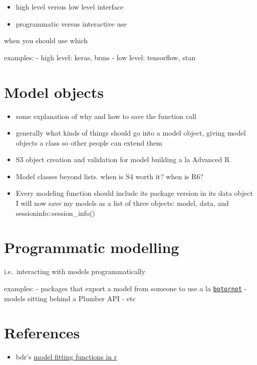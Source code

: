\documentclass[]{book}
\providecommand{\tightlist}{%
  \setlength{\itemsep}{0pt}\setlength{\parskip}{0pt}}
\theoremstyle{definition}
\theoremstyle{definition}
\theoremstyle{definition}
\theoremstyle{remark}
\begin{document}
\begin{itemize}
\tightlist
\item
  high level versus low level interface
\item
  programmatic versus interactive use
\end{itemize}

when you should use which

examples: - high level: keras, brms - low level: tensorflow, stan

\chapter{Model objects}\label{model-objects}

\begin{itemize}
\item
  some explanation of why and how to save the function call
\item
  generally what kinds of things should go into a model object, giving
  model objects a class so other people can extend them
\item
  S3 object creation and validation for model building a la Advanced R
\item
  Model classes beyond lists. when is S4 worth it? when is R6?
\item
  Every modeling function should include its package version in its data
  object I will now save my models as a list of three objects: model,
  data, and sessioninfo::session\_info()
\end{itemize}

\chapter{Programmatic modelling}\label{programmatic-modelling}

i.e.~interacting with models programmatically

examples: - packages that export a model from someone to use a la
\href{https://github.com/mkearney/tweetbotornot}{\texttt{botornot}} -
models sitting behind a Plumber API - etc

\chapter{References}\label{references}

\begin{itemize}
\tightlist
\item
  bdr's
  \href{https://developer.r-project.org/model-fitting-functions.html}{model
  fitting functions in r}
\end{itemize}
\end{document}
